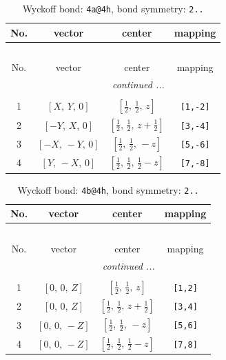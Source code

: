 \documentclass[fleqn,8pt]{jsarticle}
\begin{document}
\begin{longtable}{cccc}
\caption{Wyckoff bond: {\tt 4a@4h}, bond symmetry: {\tt 2..}}
 \\
 \hline \hline
No. & vector & center & mapping \\ \hline \endfirsthead

\multicolumn{3}{l}{\tablename\ \thetable{}} \\
 \hline \hline
No. & vector & center & mapping \\ \hline \endhead

 \hline \hline
\multicolumn{3}{r}{\footnotesize\it continued ...} \\ \endfoot

 \hline \hline
\multicolumn{3}{r}{} \\ \endlastfoot

1 & $\left[ X,\, Y,\, 0 \right]$ & $\left[ \frac{1}{2},\, \frac{1}{2},\, z \right]$ & {\tt [1,-2]} \\ \hline
2 & $\left[ - Y,\, X,\, 0 \right]$ & $\left[ \frac{1}{2},\, \frac{1}{2},\, z + \frac{1}{2} \right]$ & {\tt [3,-4]} \\ \hline
3 & $\left[ - X,\, - Y,\, 0 \right]$ & $\left[ \frac{1}{2},\, \frac{1}{2},\, - z \right]$ & {\tt [5,-6]} \\ \hline
4 & $\left[ Y,\, - X,\, 0 \right]$ & $\left[ \frac{1}{2},\, \frac{1}{2},\, \frac{1}{2} - z \right]$ & {\tt [7,-8]} \\
\end{longtable}
\renewcommand{\arraystretch}{1.2}
\begin{longtable}{cccc}
\caption{Wyckoff bond: {\tt 4b@4h}, bond symmetry: {\tt 2..}}
 \\
 \hline \hline
No. & vector & center & mapping \\ \hline \endfirsthead

\multicolumn{3}{l}{\tablename\ \thetable{}} \\
 \hline \hline
No. & vector & center & mapping \\ \hline \endhead

 \hline \hline
\multicolumn{3}{r}{\footnotesize\it continued ...} \\ \endfoot

 \hline \hline
\multicolumn{3}{r}{} \\ \endlastfoot

1 & $\left[ 0,\, 0,\, Z \right]$ & $\left[ \frac{1}{2},\, \frac{1}{2},\, z \right]$ & {\tt [1,2]} \\ \hline
2 & $\left[ 0,\, 0,\, Z \right]$ & $\left[ \frac{1}{2},\, \frac{1}{2},\, z + \frac{1}{2} \right]$ & {\tt [3,4]} \\ \hline
3 & $\left[ 0,\, 0,\, - Z \right]$ & $\left[ \frac{1}{2},\, \frac{1}{2},\, - z \right]$ & {\tt [5,6]} \\ \hline
4 & $\left[ 0,\, 0,\, - Z \right]$ & $\left[ \frac{1}{2},\, \frac{1}{2},\, \frac{1}{2} - z \right]$ & {\tt [7,8]} \\
\end{longtable}
\end{document}
